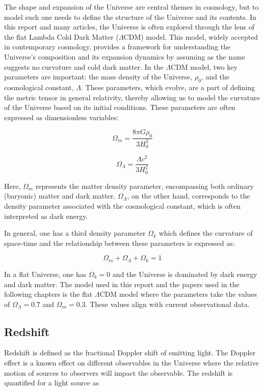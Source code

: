 The shape and expansion of the Universe are central themes in cosmology, but to model such one needs to define the structure of the Universe and its contents. 
In this report and many articles, the Universe is
often explored through the lens of the flat Lambda Cold Dark Matter ($\Lambda$CDM) model. 
This model, widely accepted in contemporary cosmology, provides a framework for understanding the Universe's composition and its expansion dynamics by assuming as the name suggests no curvature and cold dark matter.
In the $\Lambda$CDM model, two key parameters are important: the mass density of the Universe, $\rho_0$, and the cosmological constant, $\Lambda$.
These parameters, which evolve, are a part of defining the metric tensor in general relativity, thereby allowing us to model the curvature of the Universe based on its initial conditions.
These parameters are often expressed as dimensionless variables:

$$
\Omega_m = \frac{8\pi G\rho_0}{3H_0^2}
$$

$$
\Omega_\Lambda = \frac{\Lambda c^2}{3H_0^2}
$$

Here, $\Omega_m$ represents the matter density parameter, encompassing both ordinary (baryonic) matter and dark matter. 
$\Omega_\Lambda$, on the other hand, corresponds to the density parameter associated with the cosmological constant, which is often interpreted as dark energy.




In general, one has a third density parameter $\Omega_k$ which defines the curvature of space-time and the relationship between these parameters is expressed as: 

$$
\Omega_m + \Omega_\Lambda + \Omega_k = 1
$$


In a flat Universe, one has $\Omega_k = 0$ and the Universe is dominated by dark energy and dark matter. The model used in this report and the papers used in the following chapters is the flat $\Lambda$CDM model where the parameters take the values of 
$\Omega_\Lambda = 0.7$ and $\Omega_m = 0.3$. These values align with current observational data.



\subsection{Redshift}
Redshift is defined as the fractional Doppler shift of emitting light. The Doppler effect is a known effect on different observables in the Universe where the relative motion of sources to observers will impact the observable. The redshift is quantified for a light source as 

